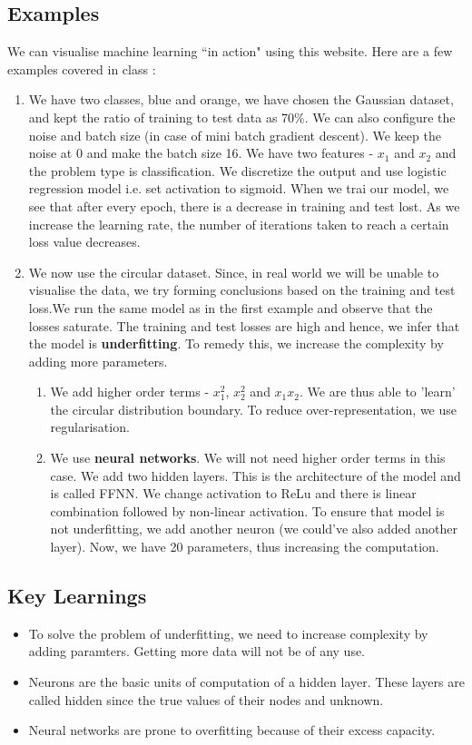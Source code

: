 \documentclass[11pt, twosides]{article}
\begin{document}
\subsection{Examples} We can visualise machine learning ``in action" using this website. Here are a few examples covered in class :
\begin{enumerate}
    \item We have two classes, blue and orange, we have chosen the Gaussian dataset, and kept the ratio of training to test data as 70$\%$. We can also configure the noise and batch size (in case of mini batch gradient descent). We keep the noise at 0 and make the batch size 16. We have two features - $x_1$ and $x_2$ and the problem type is classification. We discretize the output and use logistic regression model i.e. set activation to sigmoid.
    When we trai  our model, we see that after every epoch, there is a decrease in training and test lost. As we increase the learning rate, the number of iterations taken to reach a certain loss value decreases. 
    \item We now use the circular dataset. Since, in real world we will be unable to visualise the data, we try forming conclusions based on the training and test loss.We run the same model as in the first example and observe that the losses saturate. The training and test losses are high and hence, we infer that the model is \textbf{underfitting}. To remedy this, we increase the complexity by adding more parameters.
    \begin{enumerate}
        \item We add higher order terms - $x_1^2$, $x_2^2$ and $x_1x_2$. We are thus able to 'learn' the circular distribution boundary. To reduce over-representation, we use regularisation.
        \item We use \textbf{neural networks}. We will not need higher order terms in this case. We add two hidden layers. This is the architecture of the model and is called FFNN. We change activation to ReLu and there is linear combination followed by non-linear activation. To ensure that model is not underfitting, we add another neuron (we could've also added another layer). Now, we have 20 parameters, thus increasing the computation.
    \end{enumerate}
\end{enumerate}

\subsection{Key Learnings}
\begin{itemize}
    \item To solve the problem of underfitting, we need to increase complexity by adding paramters. Getting more data will not be of any use.
    \item Neurons are the basic units of computation of a hidden layer. These layers are called hidden since the true values of their nodes and unknown.
    \item Neural networks are prone to overfitting because of their excess capacity. 
\end{itemize}
\end{document}
